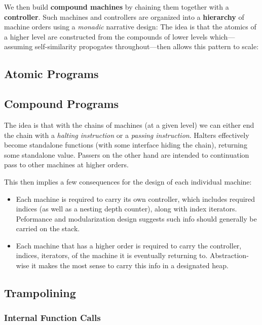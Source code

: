 \documentclass[twoside]{article}
\newcommand{\strong}[1]{{\bfseries #1}}
\begin{document}
We then build \strong{compound machines} by chaining them together with a \strong{controller}.
Such machines and controllers are organized into a \strong{hierarchy} of machine orders using
a \emph{monadic} narrative design: The idea is that the atomics of a higher level are constructed
from the compounds of lower levels which---assuming self-similarity propogates throughout---then
allows this pattern to scale:

\subsection*{Atomic Programs}

\subsection*{Compound Programs}

The idea is that with the chains of machines (at a given level) we can either end the chain with
a \emph{halting instruction} or a \emph{passing instruction}. Halters effectively become standalone functions
(with some interface hiding the chain), returning some standalone value. Passers on the other hand are intended
to continuation pass to other machines at higher orders.

This then implies a few consequences for the design of each individual machine:

\begin{itemize}
\item Each machine is required to carry its own controller, which includes required indices (as well as a nesting
depth counter), along with index iterators. Peformance and modularization design suggests such info should generally
be carried on the stack.
\item Each machine that has a higher order is required to carry the controller, indices, iterators, of the machine
it is eventually returning to. Abstraction-wise it makes the most sense to carry this info in a designated heap.
\end{itemize}

\subsection*{Trampolining}

\subsubsection*{Internal Function Calls}
\end{document}
